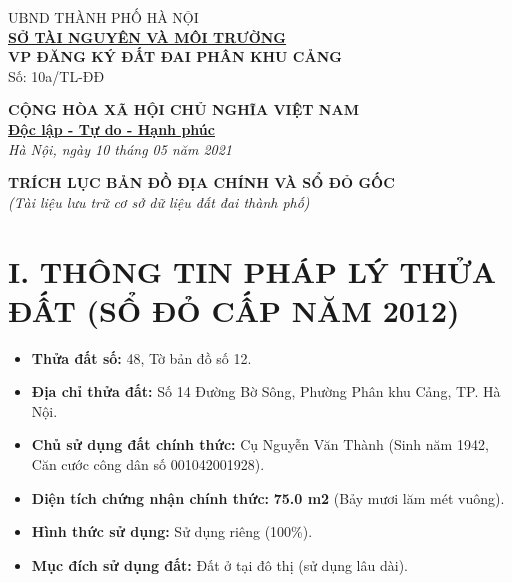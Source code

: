 \documentclass[12pt,a4paper]{article}
\begin{document}
\noindent
\begin{minipage}[t]{0.5\textwidth}
    \begin{center}
        \small
        UBND THÀNH PHỐ HÀ NỘI\\
        \textbf{\underline{SỞ TÀI NGUYÊN VÀ MÔI TRƯỜNG}}\\[0.1cm]
        \textbf{VP ĐĂNG KÝ ĐẤT ĐAI PHÂN KHU CẢNG}\\
        Số: 10a/TL-ĐĐ
    \end{center}
\end{minipage}
\hfill
\begin{minipage}[t]{0.48\textwidth}
    \begin{center}
        \small
        \textbf{CỘNG HÒA XÃ HỘI CHỦ NGHĨA VIỆT NAM}\\
        \textbf{\underline{Độc lập - Tự do - Hạnh phúc}}\\[0.1cm]
        \textit{Hà Nội, ngày 10 tháng 05 năm 2021}
    \end{center}
\end{minipage}

\vspace{0.6cm}

\begin{center}
    \textbf{\large TRÍCH LỤC BẢN ĐỒ ĐỊA CHÍNH VÀ SỔ ĐỎ GỐC}\\
    \textit{(Tài liệu lưu trữ cơ sở dữ liệu đất đai thành phố)}
\end{center}

\vspace{0.3cm}

\section*{I. THÔNG TIN PHÁP LÝ THỬA ĐẤT (SỔ ĐỎ CẤP NĂM 2012)}
\begin{itemize}[leftmargin=1.5cm]
    \item \textbf{Thửa đất số:} 48, Tờ bản đồ số 12.
    \item \textbf{Địa chỉ thửa đất:} Số 14 Đường Bờ Sông, Phường Phân khu Cảng, TP. Hà Nội.
    \item \textbf{Chủ sử dụng đất chính thức:} Cụ Nguyễn Văn Thành (Sinh năm 1942, Căn cước công dân số 001042001928).
    \item \textbf{Diện tích chứng nhận chính thức:} \textbf{75.0 m2} (Bảy mươi lăm mét vuông).
    \item \textbf{Hình thức sử dụng:} Sử dụng riêng (100\%).
    \item \textbf{Mục đích sử dụng đất:} Đất ở tại đô thị (sử dụng lâu dài).
\end{itemize}
\end{document}
